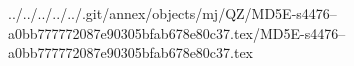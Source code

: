 ../../../../../.git/annex/objects/mj/QZ/MD5E-s4476--a0bb777772087e90305bfab678e80c37.tex/MD5E-s4476--a0bb777772087e90305bfab678e80c37.tex
